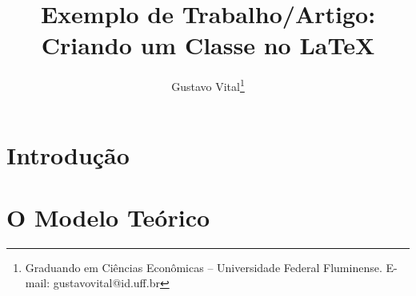 \documentclass[11pt,a4paper]{artigo}
\author{Gustavo Vital\thanks{Graduando em Ciências Econômicas -- Universidade Federal Fluminense. E-mail: gustavovital@id.uff.br}}
\title{Exemplo de Trabalho/Artigo: Criando um Classe no \LaTeX}
\begin{document}
\maketitle

\begin{resumo}
\lipsum[3]
\end{resumo}

\section{Introdução}
\lipsum[3-5]
\section{O Modelo Teórico}
\lipsum[2-5]
\end{document}
